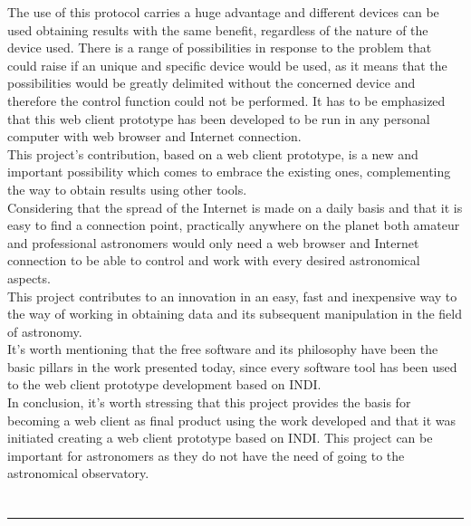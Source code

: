 The use of this protocol carries a huge advantage and different devices can be used obtaining results with the same benefit, regardless of the nature of the device used. There is a range of possibilities in response to the problem that could raise if an unique and specific device would be used, as it means that the possibilities would be greatly delimited without the concerned  device and therefore the control function could not be performed. It has to be emphasized that this web client prototype has been developed to be run in any personal computer with web browser and Internet connection.\\

This project’s contribution, based on a web client prototype, is a new and important possibility which comes to embrace the existing ones, complementing the way to obtain results using other tools.\\

Considering that the spread of the Internet is made on a daily basis and that it is easy to find a connection point, practically anywhere on the planet both amateur and professional astronomers would only need a web browser and Internet connection to be able to control and work with every desired astronomical aspects.\\

This project contributes to an innovation in an easy, fast and inexpensive way to the way of working in obtaining data and its subsequent manipulation in the field of astronomy.\\

It’s worth mentioning that the free software and its philosophy have been the basic pillars in the work presented today,  since every software tool has been used to the web client prototype development based on INDI.\\

In conclusion, it’s worth stressing that this project provides the basis for becoming a web client as final product using the work developed and that it was initiated creating a web client prototype based on INDI. This project can be important for astronomers as they do not have the need of going to the astronomical observatory.

\chapter*{}
\thispagestyle{empty}

\noindent\rule[-1ex]{\textwidth}{2pt}\\[4.5ex]

